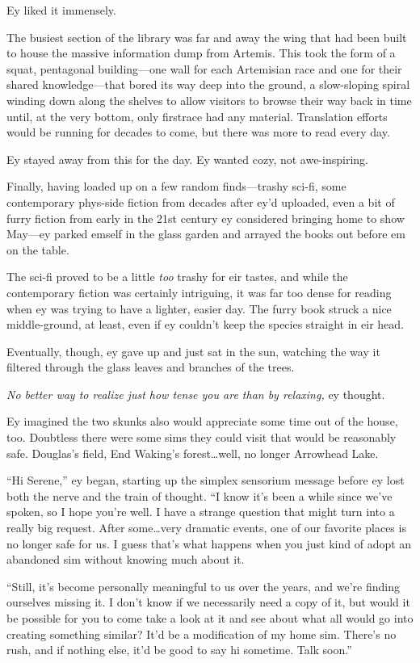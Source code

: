 Ey liked it immensely.

The busiest section of the library was far and away the wing that had been built to house the massive information dump from Artemis. This took the form of a squat, pentagonal building—one wall for each Artemisian race and one for their shared knowledge—that bored its way deep into the ground, a slow-sloping spiral winding down along the shelves to allow visitors to browse their way back in time until, at the very bottom, only firstrace had any material. Translation efforts would be running for decades to come, but there was more to read every day.

Ey stayed away from this for the day. Ey wanted cozy, not awe-inspiring.

Finally, having loaded up on a few random finds—trashy sci-fi, some contemporary phys-side fiction from decades after ey'd uploaded, even a bit of furry fiction from early in the 21st century ey considered bringing home to show May—ey parked emself in the glass garden and arrayed the books out before em on the table.

The sci-fi proved to be a little \emph{too} trashy for eir tastes, and while the contemporary fiction was certainly intriguing, it was far too dense for reading when ey was trying to have a lighter, easier day. The furry book struck a nice middle-ground, at least, even if ey couldn't keep the species straight in eir head.

Eventually, though, ey gave up and just sat in the sun, watching the way it filtered through the glass leaves and branches of the trees.

\emph{No better way to realize just how tense you are than by relaxing,} ey thought.

Ey imagined the two skunks also would appreciate some time out of the house, too. Doubtless there were some sims they could visit that would be reasonably safe. Douglas's field, End Waking's forest\ldots well, no longer Arrowhead Lake.

``Hi Serene,'' ey began, starting up the simplex sensorium message before ey lost both the nerve and the train of thought. ``I know it's been a while since we've spoken, so I hope you're well. I have a strange question that might turn into a really big request. After some\ldots very dramatic events, one of our favorite places is no longer safe for us. I guess that's what happens when you just kind of adopt an abandoned sim without knowing much about it.

``Still, it's become personally meaningful to us over the years, and we're finding ourselves missing it. I don't know if we necessarily need a copy of it, but would it be possible for you to come take a look at it and see about what all would go into creating something similar? It'd be a modification of my home sim. There's no rush, and if nothing else, it'd be good to say hi sometime. Talk soon.''

